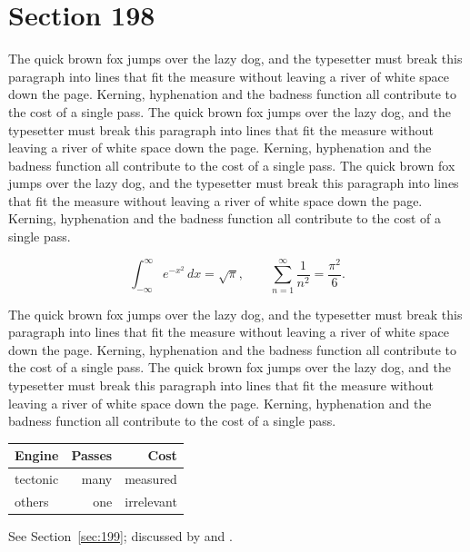 \documentclass{article}
\begin{document}
\section{Section 198}
\label{sec:198}
The quick brown fox jumps over the lazy dog, and the typesetter must break this paragraph into lines that fit the measure without leaving a river of white space down the page. Kerning, hyphenation and the badness function all contribute to the cost of a single pass. The quick brown fox jumps over the lazy dog, and the typesetter must break this paragraph into lines that fit the measure without leaving a river of white space down the page. Kerning, hyphenation and the badness function all contribute to the cost of a single pass. The quick brown fox jumps over the lazy dog, and the typesetter must break this paragraph into lines that fit the measure without leaving a river of white space down the page. Kerning, hyphenation and the badness function all contribute to the cost of a single pass. 

\begin{equation}\label{eq:198}
\int_{-\infty}^{\infty} e^{-x^{2}}\,dx = \sqrt{\pi}, \qquad
\sum_{n=1}^{\infty} \frac{1}{n^{2}} = \frac{\pi^{2}}{6}.
\end{equation}

The quick brown fox jumps over the lazy dog, and the typesetter must break this paragraph into lines that fit the measure without leaving a river of white space down the page. Kerning, hyphenation and the badness function all contribute to the cost of a single pass. The quick brown fox jumps over the lazy dog, and the typesetter must break this paragraph into lines that fit the measure without leaving a river of white space down the page. Kerning, hyphenation and the badness function all contribute to the cost of a single pass. 

\begin{center}
\begin{tabular}{lrr}
\toprule
Engine & Passes & Cost \\
\midrule
tectonic & many & measured \\
others & one & irrelevant \\
\bottomrule
\end{tabular}
\end{center}

See Section~\ref{sec:199}; discussed by \textcite{k4} and \textcite{l1}.
\end{document}
